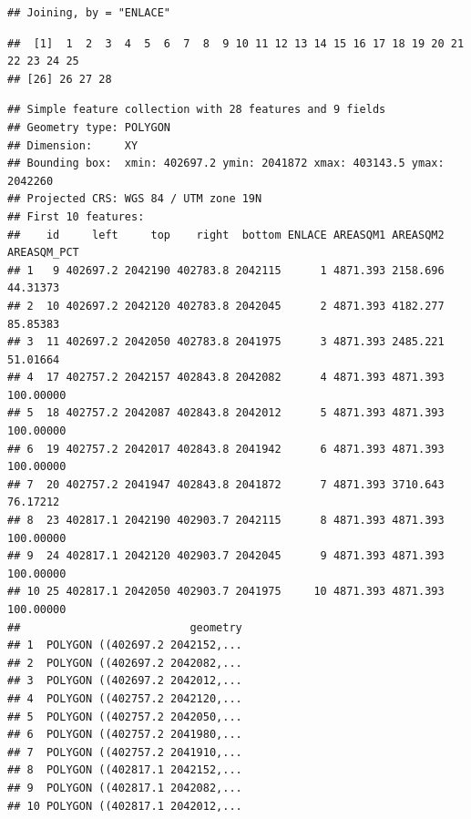 \documentclass[
  11pt,
]{article}
\newenvironment{Shaded}{\begin{snugshade}}{\end{snugshade}}
\newcommand{\DecValTok}[1]{\textcolor[rgb]{0.00,0.00,0.81}{#1}}
\newcommand{\FunctionTok}[1]{\textcolor[rgb]{0.00,0.00,0.00}{#1}}
\newcommand{\NormalTok}[1]{#1}
\newcommand{\OtherTok}[1]{\textcolor[rgb]{0.56,0.35,0.01}{#1}}
\newcommand{\SpecialCharTok}[1]{\textcolor[rgb]{0.00,0.00,0.00}{#1}}
\newcommand{\StringTok}[1]{\textcolor[rgb]{0.31,0.60,0.02}{#1}}
\begin{document}
\begin{verbatim}
## Joining, by = "ENLACE"
\end{verbatim}

\begin{Shaded}
\end{Shaded}

\begin{verbatim}
##  [1]  1  2  3  4  5  6  7  8  9 10 11 12 13 14 15 16 17 18 19 20 21 22 23 24 25
## [26] 26 27 28
\end{verbatim}

\begin{Shaded}
\end{Shaded}

\begin{verbatim}
## Simple feature collection with 28 features and 9 fields
## Geometry type: POLYGON
## Dimension:     XY
## Bounding box:  xmin: 402697.2 ymin: 2041872 xmax: 403143.5 ymax: 2042260
## Projected CRS: WGS 84 / UTM zone 19N
## First 10 features:
##    id     left     top    right  bottom ENLACE AREASQM1 AREASQM2 AREASQM_PCT
## 1   9 402697.2 2042190 402783.8 2042115      1 4871.393 2158.696    44.31373
## 2  10 402697.2 2042120 402783.8 2042045      2 4871.393 4182.277    85.85383
## 3  11 402697.2 2042050 402783.8 2041975      3 4871.393 2485.221    51.01664
## 4  17 402757.2 2042157 402843.8 2042082      4 4871.393 4871.393   100.00000
## 5  18 402757.2 2042087 402843.8 2042012      5 4871.393 4871.393   100.00000
## 6  19 402757.2 2042017 402843.8 2041942      6 4871.393 4871.393   100.00000
## 7  20 402757.2 2041947 402843.8 2041872      7 4871.393 3710.643    76.17212
## 8  23 402817.1 2042190 402903.7 2042115      8 4871.393 4871.393   100.00000
## 9  24 402817.1 2042120 402903.7 2042045      9 4871.393 4871.393   100.00000
## 10 25 402817.1 2042050 402903.7 2041975     10 4871.393 4871.393   100.00000
##                          geometry
## 1  POLYGON ((402697.2 2042152,...
## 2  POLYGON ((402697.2 2042082,...
## 3  POLYGON ((402697.2 2042012,...
## 4  POLYGON ((402757.2 2042120,...
## 5  POLYGON ((402757.2 2042050,...
## 6  POLYGON ((402757.2 2041980,...
## 7  POLYGON ((402757.2 2041910,...
## 8  POLYGON ((402817.1 2042152,...
## 9  POLYGON ((402817.1 2042082,...
## 10 POLYGON ((402817.1 2042012,...
\end{verbatim}
\end{document}
